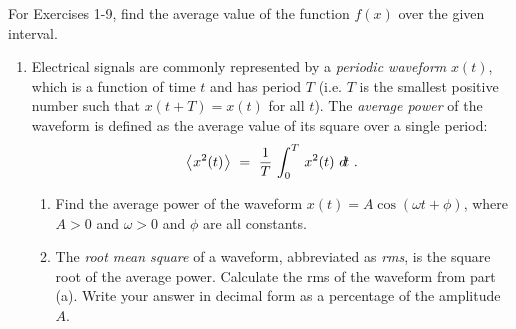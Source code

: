 \divider
\vspace{3mm}
\startexercises\label{sec8dot2}
{\small
{}
\par\noindent For Exercises 1-9, find the average value of the function $f(x)$
 over the given interval.
\begin{enumerate}[\bfseries 1.]
 \item Electrical signals are commonly represented by a \emph{periodic waveform}
   $x(t)$, which is a function
  of time $t$ and has period $T$ (i.e. $T$ is the smallest positive number such
  that $x(t+T) = x(t)$ for all $t$). The \emph{average power} of the waveform is
  defined as the average value of its square over a single period:
\[
\left\langle\mspace{1mu}x^2(t)\mspace{1mu}\right\rangle ~=~ \frac{1}{T}\,\int_0^T\,x^2(t)~d\!t ~.
\]
 \begin{enumerate}[\bfseries (a)]
  \item Find the average power of the waveform $x(t) = A \cos (\omega t + \phi)$,
   where $A >0$ and $\omega > 0$ and $\phi$ are all constants.
  \item The \emph{root mean square} of a waveform, abbreviated as \emph{rms}, is
  the square root of the average power. Calculate the rms of the waveform from
  part (a). Write your answer in decimal form as a percentage of the amplitude $A$.
 \end{enumerate}

\end{enumerate}}
